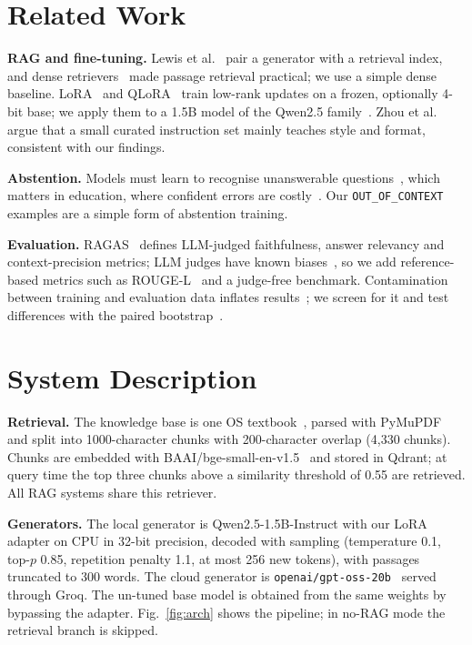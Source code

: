 \documentclass[conference]{IEEEtran}
\begin{document}
\section{Related Work}\label{sec:related}
\textbf{RAG and fine-tuning.} Lewis et al.~\cite{lewis2020rag} pair a generator with a retrieval index, and dense retrievers~\cite{karpukhin2020dpr} made passage retrieval practical; we use a simple dense baseline. LoRA~\cite{hu2022lora} and QLoRA~\cite{dettmers2023qlora} train low-rank updates on a frozen, optionally 4-bit base; we apply them to a 1.5B model of the Qwen2.5 family~\cite{qwen25}. Zhou et al.~\cite{zhou2023lima} argue that a small curated instruction set mainly teaches style and format, consistent with our findings.

\textbf{Abstention.} Models must learn to recognise unanswerable questions~\cite{rajpurkar2018squad2}, which matters in education, where confident errors are costly~\cite{kasneci2023edu}. Our \texttt{OUT\_OF\_CONTEXT} examples are a simple form of abstention training.

\textbf{Evaluation.} RAGAS~\cite{es2024ragas} defines LLM-judged faithfulness, answer relevancy and context-precision metrics; LLM judges have known biases~\cite{zheng2023judge}, so we add reference-based metrics such as ROUGE-L~\cite{lin2004rouge} and a judge-free benchmark. Contamination between training and evaluation data inflates results~\cite{magar2022contamination}; we screen for it and test differences with the paired bootstrap~\cite{efron1993bootstrap}.

\section{System Description}\label{sec:system}
\textbf{Retrieval.} The knowledge base is one OS textbook~\cite{galvin}, parsed with PyMuPDF and split into 1000-character chunks with 200-character overlap (4{,}330 chunks). Chunks are embedded with BAAI/bge-small-en-v1.5~\cite{xiao2023cpack} and stored in Qdrant; at query time the top three chunks above a similarity threshold of 0.55 are retrieved. All RAG systems share this retriever.

\textbf{Generators.} The local generator is Qwen2.5-1.5B-Instruct with our LoRA adapter on CPU in 32-bit precision, decoded with sampling (temperature 0.1, top-$p$ 0.85, repetition penalty 1.1, at most 256 new tokens), with passages truncated to 300 words. The cloud generator is \texttt{openai/gpt-oss-20b}~\cite{gptoss} served through Groq. The un-tuned base model is obtained from the same weights by bypassing the adapter. Fig.~\ref{fig:arch} shows the pipeline; in no-RAG mode the retrieval branch is skipped.
\end{document}
